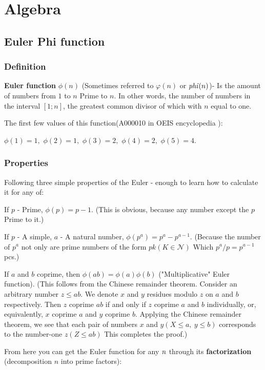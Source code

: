 \chapter{Algebra}

\section{ Euler Phi function }
\subsection{ Definition }

\textbf{Euler function} $\phi (n)$ (Sometimes referred to $\varphi (n)$ or ${\it phi} (n)$)- Is the amount of numbers from $1$ to $n$ Prime to $n$. In other words, the number of numbers in the interval $[1; n]$, the greatest common divisor of which with $n$ equal to one.

The first few values ​​of this function(A000010 in OEIS encyclopedia ):

$\phi (1) = 1,$
$\phi (2) = 1,$
$\phi (3) = 2,$
$\phi (4) = 2,$
$\phi (5) = 4.$

\subsection{ Properties }

Following three simple properties of the Euler - enough to learn how to calculate it for any of:

If $p$ - Prime, $\phi (p) = p-1$.
(This is obvious, because any number except the $p$ Prime to it.)

If $p$ - A simple, $a$ - A natural number, $\phi (p ^ a) = p ^ a-p ^ {a-1}$.
(Because the number of $p ^ a$ not only are prime numbers of the form $pk$$(K \in \mathcal {N})$ Which $p ^ a / p = p ^ {a-1}$ pcs.)

If $a$ and $b$ coprime, then $\phi (ab) = \phi (a) \phi (b)$ ("Multiplicative" Euler function).
(This follows from the Chinese remainder theorem. Consider an arbitrary number $z \le ab$. We denote $x$ and $y$ residues modulo $z$ on $a$ and $b$ respectively. Then $z$ coprime $ab$ if and only if $z$ coprime $a$ and $b$ individually, or, equivalently, $x$ coprime $a$ and $y$ coprime $b$. Applying the Chinese remainder theorem, we see that each pair of numbers $x$ and $y$$(X \le a, ~ y \le b)$ corresponds to the number-one $z$$(Z \le ab)$ This completes the proof.)

From here you can get the Euler function for any $\it n$ through its \textbf{factorization} (decomposition $n$ into prime factors):

